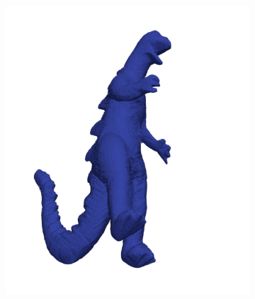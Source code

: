 \begin{figure}[ht]
\begin{subfigure}[b]{0.4\textwidth}
    \caption{}
  \end{subfigure}
  \\
  \begin{subfigure}[b]{0.4\textwidth}
    \centering
    \includegraphics[width=\textwidth]{images/q2_dino_view_3.png}
    \caption{}
  \end{subfigure}
  \hspace{1em}
  \begin{subfigure}[b]{0.4\textwidth}
    \centering

\end{subfigure}
\end{figure}
